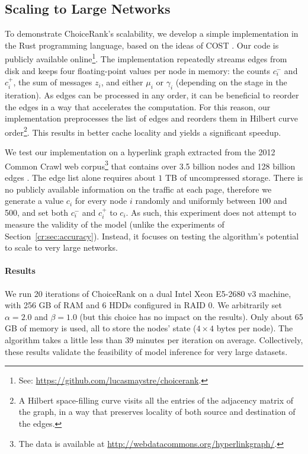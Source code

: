\subsection{Scaling to Large Networks}

To demonstrate ChoiceRank's scalability, we develop a simple implementation in the Rust programming language, based on the ideas of COST \citep{mcsherry2015scalability}.
Our code is publicly available online\footnote{See: \url{https://github.com/lucasmaystre/choicerank}.}.
The implementation repeatedly streams edges from disk and keeps four floating-point values per node in memory:
the counts $c^-_i$ and $c^+_i$, the sum of messages $z_i$, and either $\mu_i$ or $\gamma_i$ (depending on the stage in the iteration).
As edges can be processed in any order, it can be beneficial to reorder the edges in a way that accelerates the computation.
For this reason, our implementation preprocesses the list of edges and reorders them in Hilbert curve order\footnote{A Hilbert space-filling curve visits all the entries of the adjacency matrix of the graph, in a way that preserves locality of both source and destination of the edges.}.
This results in better cache locality and yields a significant speedup.

We test our implementation on a hyperlink graph extracted from the 2012 Common Crawl web corpus\footnote{
The data is available at \url{http://webdatacommons.org/hyperlinkgraph/}.} that contains over \num{3.5} billion nodes and \num{128} billion edges \citep{meusel2014graph}.
The edge list alone requires about $1$ TB of uncompressed storage.
There is no publicly available information on the traffic at each page, therefore we generate a value $c_i$ for every node $i$ randomly and uniformly between \num{100} and \num{500}, and set both $c^-_i$ and $c^+_i$ to $c_i$.
As such, this experiment does not attempt to measure the validity of the model (unlike the experiments of Section~\ref{cr:sec:accuracy}).
Instead, it focuses on testing the algorithm's potential to scale to very large networks.

\paragraph{Results}
We run \num{20} iterations of ChoiceRank on a dual Intel Xeon E5-2680 v3 machine, with \num{256} GB of RAM and \num{6} HDDs configured in RAID 0.
We arbitrarily set $\alpha = 2.0$ and $\beta = 1.0$ (but this choice has no impact on the results).
Only about \num{65} GB of memory is used, all to store the nodes' state ($4 \times 4$ bytes per node).
The algorithm takes a little less than \num{39} minutes per iteration on average.
Collectively, these results validate the feasibility of model inference for very large datasets.

